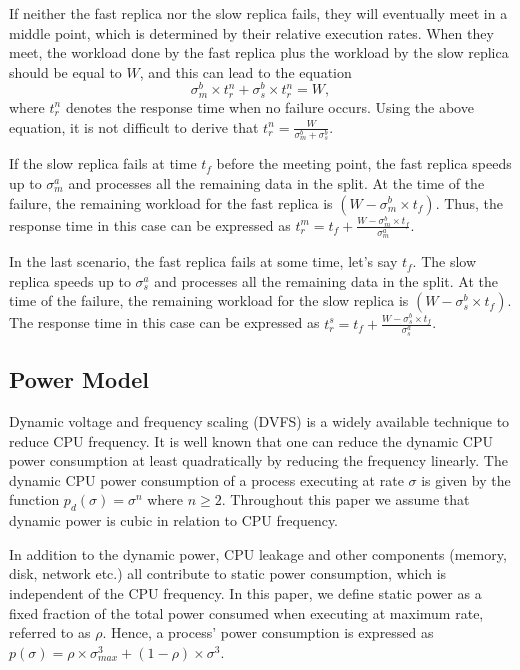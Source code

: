 If neither the fast replica nor the slow replica fails, they will eventually meet in a middle point, which is determined by their relative execution rates. When they meet, the workload done by the fast replica plus the workload by the slow replica should be equal to $W$, and this can lead to the equation $$\sigma_m^b \times t_r^n + \sigma_s^b \times t_r^n = W,$$ where $t_r^n$ denotes the response time when no failure occurs. Using the above equation, it is not difficult to derive that $t_r^n = \frac{W}{\sigma_m^b+\sigma_s^b}$.

If the slow replica fails at time $t_f$ before the meeting point, the fast replica speeds up to $\sigma_m^a$ and processes all the remaining data in the split. At the time of the failure, the remaining workload for the fast replica is $(W-\sigma_m^b \times t_f)$. Thus, the response time in this case can be expressed as $t_r^m = t_f + \frac{W-\sigma_m^b \times t_f}{\sigma_m^a}$.

In the last scenario, the fast replica fails at some time, let's say $t_f$. The slow replica speeds up to $\sigma_s^a$ and processes all the remaining data in the split.  At the time of the failure, the remaining workload for the slow replica is $(W-\sigma_s^b \times t_f)$. The response time in this case can be expressed as $t_r^s = t_f + \frac{W-\sigma_s^b \times t_f}{\sigma_s^a}$.


\subsection{Power Model}
\label{sec:power_model}
Dynamic voltage and frequency scaling
(DVFS) is a widely available technique to reduce CPU frequency. It
is well known that one can reduce the dynamic CPU power consumption at
least quadratically by reducing the frequency linearly. The
dynamic CPU power consumption of a process executing at rate
$\sigma$ is given by the function $p_d(\sigma)=\sigma^n$ where $n \ge
2$. Throughout this paper we assume that dynamic power is cubic
in relation to CPU frequency.

In addition to the dynamic power, CPU leakage and other components
(memory, disk, network etc.) all contribute to static power
consumption, which is independent of the CPU frequency. In this paper, we
define static power as a fixed fraction of the total power consumed
when executing at maximum rate, referred to as $\rho$. Hence, a process'
power consumption is expressed as
$p(\sigma)=\rho \times \sigma_{max}^3 + (1-\rho)\times \sigma^3$. 

